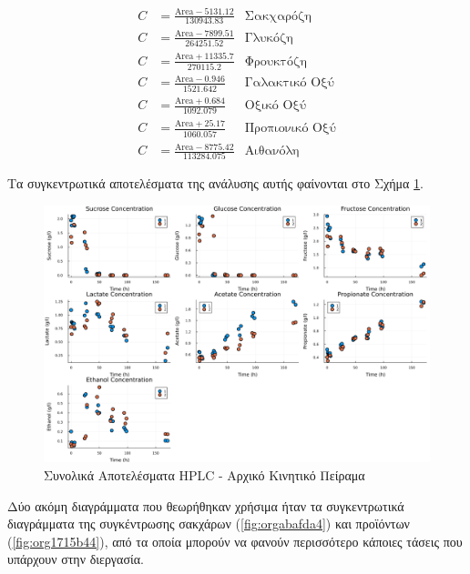 \documentclass[11pt]{report}
\begin{document}
\begin{enumerate}
\begin{subequations}
\label{eqn:hplc-calibration}
\begin{align}
C &= \frac{\text{Area} - 5131.12}{130943.83} & \text{Σακχαρόζη} \label{eqn:hplc-sucrose} \\
C &= \frac{\text{Area} - 7899.51}{264251.52} & \text{Γλυκόζη} \label{eqn:hplc-glucose} \\
C &= \frac{\text{Area} + 11335.7}{270115.2} & \text{Φρουκτόζη} \label{eqn:hplc-fructose} \\
C &= \frac{\text{Area} - 0.946}{1521.642} & \text{Γαλακτικό Οξύ} \label{eqn:hplc-lactate} \\
C &= \frac{\text{Area} + 0.684}{1092.079} & \text{Οξικό Οξύ} \label{eqn:hplc-acetate} \\
C &= \frac{\text{Area} + 25.17}{1060.057} & \text{Προπιονικό Οξύ} \label{eqn:hplc-propionate} \\
C &= \frac{\text{Area} - 8775.42}{113284.075} & \text{Αιθανόλη} \label{eqn:hplc-ethanol}
\end{align}
\end{subequations}

Τα συγκεντρωτικά αποτελέσματα της ανάλυσης αυτής φαίνονται στο Σχήμα \ref{fig:org19231c4}. 

\begin{figure}[htbp]
\centering
\includegraphics[width=.9\linewidth]{../plots/23_10/final_scatter_23_10.png}
\caption{\label{fig:org19231c4}Συνολικά Αποτελέσματα HPLC - Αρχικό Κινητικό Πείραμα}
\end{figure}

Δύο ακόμη διαγράμματα που θεωρήθηκαν χρήσιμα ήταν τα συγκεντρωτικά διαγράμματα της συγκέντρωσης σακχάρων (\ref{fig:orgabafda4}) και προϊόντων (\ref{fig:org1715b44}), από τα οποία μπορούν να φανούν περισσότερο κάποιες τάσεις που υπάρχουν στην διεργασία.


\end{enumerate}
\end{document}
